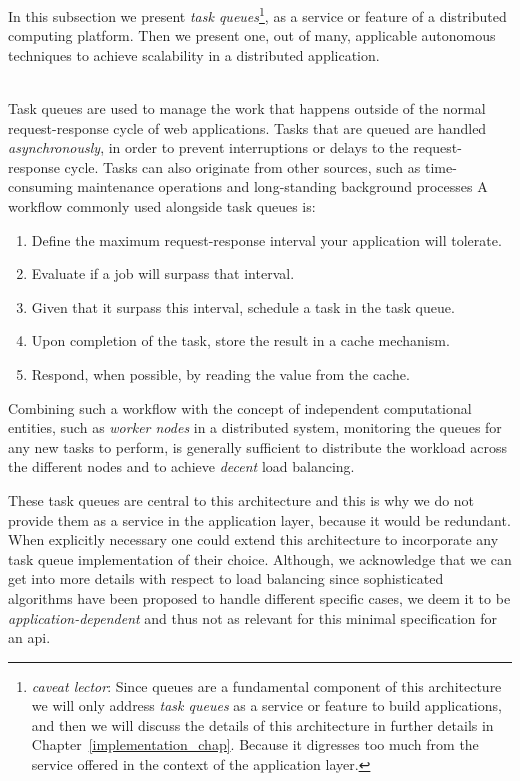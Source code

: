 \documentclass[12pt, titlepage]{uo_temp}
\begin{document}
     In this subsection we present \emph{task queues}\footnote{\emph{caveat lector}: Since
       queues are a fundamental component of this architecture we will only address
       \emph{task queues} as a service or feature to build applications, and then we will
       discuss the details of this architecture in further details in
       Chapter~\ref{implementation_chap}. Because it digresses too much from the service
       offered in the context of the application layer.}, as a service or feature of a
     distributed computing platform. Then we present one, out of many, applicable
     autonomous techniques to achieve scalability in a distributed application.
     
     \\ Task queues are used to manage the work that happens outside of the normal
     request-response cycle of web applications. Tasks that are queued are handled
     \emph{asynchronously}, in order to prevent interruptions or delays to the
     request-response cycle. Tasks can also originate from other sources, such as
     time-consuming maintenance operations and long-standing background processes A
     workflow commonly used alongside task queues is:
     \begin{enumerate}
     \item Define the maximum request-response interval your application will tolerate. 
     \item Evaluate if a job will surpass that interval.
     \item Given that it surpass this interval, schedule a task in the task queue.
     \item Upon completion of the task, store the result in a cache mechanism.
     \item Respond, when possible, by reading the value from the cache.
     \end{enumerate}
     
     Combining such a workflow with the concept of independent computational entities,
     such as \emph{worker nodes} in a distributed system, monitoring the queues for
     any new tasks to perform, is generally sufficient to distribute the workload across
     the different nodes and to achieve \emph{decent} load balancing.

     These task queues are central to this architecture and this is why we do not provide
     them as a service in the application layer, because it would be redundant. When
     explicitly necessary one could extend this architecture to incorporate any task queue
     implementation of their choice. Although, we acknowledge that we can get into more
     details with respect to load balancing since sophisticated algorithms have been
     proposed to handle different specific cases, we deem it to be
     \emph{application-dependent} and thus not as relevant for this minimal specification
     for an \gls{api}.
\end{document}
